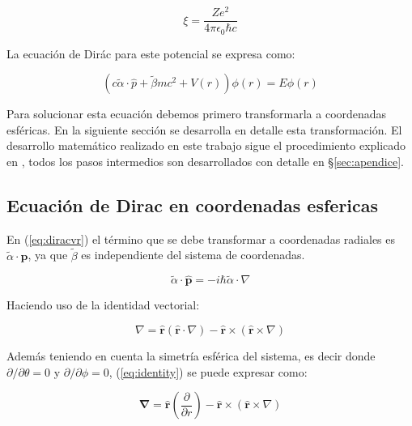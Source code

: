 \documentclass[a4paper, 12pt]{article} %
\begin{document}
\begin{equation}
\xi = \dfrac{Ze^2}{4\pi \epsilon_0 \hbar c}
\end{equation}

La ecuaci\'on de Dir\'ac para este potencial se expresa como:

\begin{equation}\label{eq:diracvr}
(c \widetilde{\alpha} \cdot \hat{p} + \widetilde{\beta} m c^2 + V(r) ) \phi(r) = E \phi (r)
\end{equation}

Para solucionar esta ecuaci\'on debemos primero transformarla a coordenadas
esf\'ericas. En la siguiente secci\'on se desarrolla en detalle esta transformaci\'on.
El desarrollo matem\'atico realizado en este trabajo sigue el procedimiento 
explicado en \cite{strange}, todos los pasos intermedios son desarrollados con 
detalle en \S \ref{sec:apendice}. 
\subsection{Ecuaci\'on de Dirac en coordenadas esfericas}

En (\ref{eq:diracvr}) el t\'ermino que se debe transformar a coordenadas radiales
 es $\widetilde{\alpha} \cdot \hat{\mathbf{p}}$, ya que $\widetilde{\beta}$ es independiente del sistema de coordenadas. 

\begin{equation}\label{eq:alphap}
\widetilde{\alpha} \cdot \hat{\mathbf{p}} = -i \hbar \widetilde{\alpha} \cdot \nabla
\end{equation}

Haciendo uso de la identidad vectorial: 

\begin{equation}\label{eq:identity}
\nabla = \hat{\mathbf{r}}(\hat{\mathbf{r}}\cdot \nabla) - \hat{\mathbf{r}} \times (\hat{\mathbf{r}} \times \nabla)  
\end{equation}

Adem\'as teniendo en cuenta la simetr\'ia esf\'erica del sistema, es decir donde $\partial/\partial \theta = 0$
y $\partial/\partial \phi = 0$,  (\ref{eq:identity}) se puede expresar como:

\begin{equation}\label{eq:nabla1}
\mathbf\nabla = \hat{\mathbf{r}}(\dfrac{\partial}{\partial r}) - \hat{\mathbf{r}} \times (\hat{\mathbf{r}} \times \nabla)
\end{equation}
\end{document}
